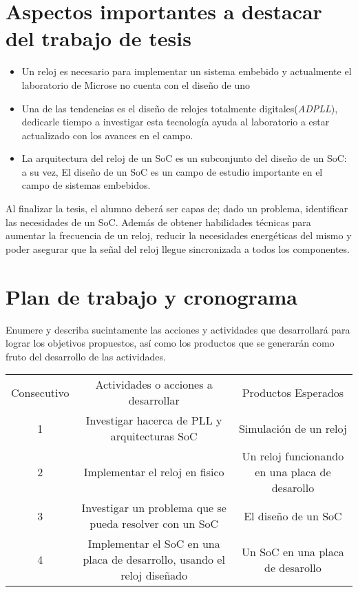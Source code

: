 \documentclass[runningheads,a4paper]{llncs}
\begin{document}
\section{Aspectos importantes a destacar del trabajo de tesis}
\begin{itemize}
\settowidth{\leftmargin}{{\Large$\circ$}}\advance\leftmargin{}
\itemsep8pt\relax
\renewcommand\labelitemi{{\lower1.5pt\hbox{\Large$\circ$}}}

     \item Un reloj es necesario para implementar un sistema embebido y actualmente el laboratorio de Microse no cuenta con el diseño de uno

     \item Una de las tendencias es el diseño de relojes totalmente digitales(\textit{ADPLL}), dedicarle tiempo a investigar esta tecnología ayuda al laboratorio a estar actualizado con los avances en el campo.

     \item La arquitectura del reloj de un SoC es un subconjunto del diseño de un SoC: a su vez, El diseño de un SoC es un campo de estudio importante en el campo de sistemas embebidos.

 \end{itemize}
Al finalizar la tesis, el alumno deberá ser capas de; dado un problema, identificar las necesidades de un SoC. Además de obtener habilidades técnicas para aumentar la frecuencia de un reloj, reducir la necesidades energéticas del mismo y poder asegurar que la señal del reloj llegue sincronizada a todos los componentes. 

\section{Plan de trabajo y cronograma}

Enumere y describa sucintamente las acciones y actividades que desarrollará para lograr los objetivos propuestos, así como los productos que se generarán como fruto del desarrollo de las actividades. 
\begin{table}
\begin{center}
 \begin{tabular}{|c|c|c|}
\hline\noalign{\smallskip}
Consecutivo & Actividades o acciones a desarrollar & Productos Esperados\\

\noalign{\smallskip}
\hline
\noalign{\smallskip}
1& Investigar hacerca de PLL y arquitecturas SoC & Simulación de un reloj \\\hline
2& Implementar el reloj en fisico & Un reloj funcionando en una placa de desarollo \\\hline
3& Investigar un problema que se pueda resolver con un SoC & El diseño de un SoC \\\hline
4& Implementar el SoC en una placa de desarrollo, usando el reloj diseñado & Un SoC en una placa de desarollo  \\
\hline
\end{tabular}
\end{center}
\end{table}
\end{document}
